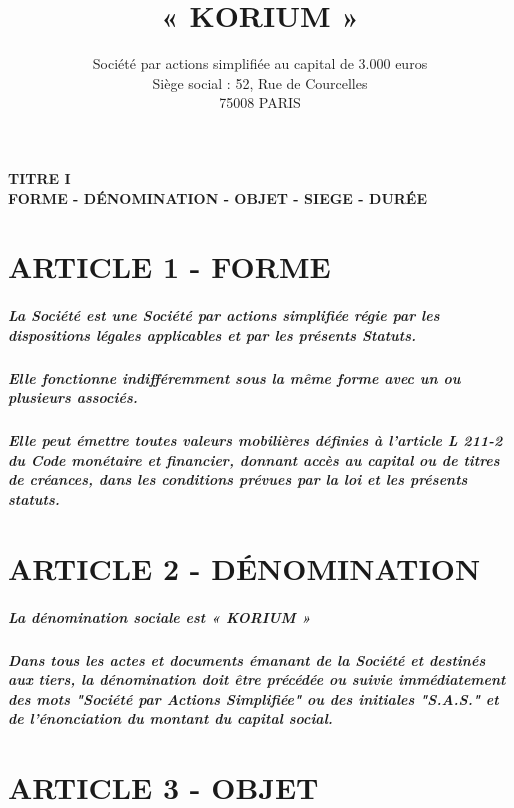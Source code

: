 \documentclass[a4paper, 11pt]{article}
\begin{document}
\title{« KORIUM »}
\author{
  Société par actions simplifiée au capital de 3.000 euros\\
  Siège social : 52, Rue de Courcelles\\
  75008 PARIS\\
}

\maketitle

\pagebreak

\paragraph{
  TITRE I\\
  FORME - DÉNOMINATION - OBJET - SIEGE - DURÉE
}

\section*{ARTICLE 1 - FORME}

\subparagraph{
  La Société est une Société par actions simplifiée régie par les dispositions  légales applicables et par les présents Statuts.
}

\subparagraph{
  Elle fonctionne indifféremment sous la même forme avec un ou plusieurs associés.
}

\subparagraph{
  Elle peut émettre toutes valeurs mobilières définies à l'article L 211-2 du Code monétaire et financier, donnant accès au capital ou de titres de créances, dans les conditions prévues par la loi et les présents statuts.
}

\section*{ARTICLE 2 - DÉNOMINATION}

\subparagraph{
  La dénomination sociale est « KORIUM »
}

\subparagraph{
  Dans tous les actes et documents émanant de la Société et destinés aux tiers, la dénomination doit être précédée ou suivie immédiatement des mots "Société par Actions Simplifiée" ou des initiales "S.A.S." et de l'énonciation du montant du capital social.
}

\section*{ARTICLE 3 - OBJET}
\end{document}
